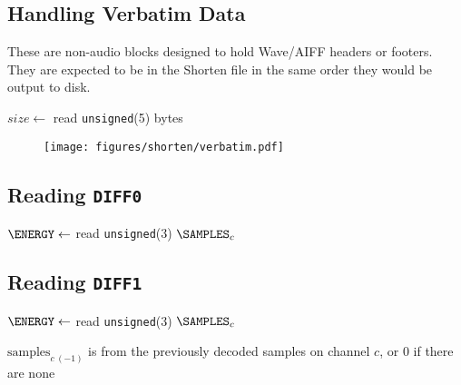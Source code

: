 \clearpage

\subsection{Handling Verbatim Data}

These are non-audio blocks designed to hold Wave/AIFF headers or footers.
They are expected to be in the Shorten file in the same order
they would be output to disk.
\par
\noindent
{}
$size \leftarrow$ read \texttt{unsigned}(5)\;
\Return bytes\;
\EALGORITHM
\begin{figure}[h]
\texttt{[image: figures/shorten/verbatim.pdf]}
\end{figure}

\clearpage

\subsection{Reading \texttt{DIFF0}}
{
$\ENERGY \leftarrow$ read \texttt{unsigned}(3)\;
\BlankLine
{}
\Return $\text{\SAMPLES}_c$\;
\EALGORITHM
}

\subsection{Reading \texttt{DIFF1}}
{
$\ENERGY \leftarrow$ read \texttt{unsigned}(3)\;
\BlankLine
{}
\Return $\text{\SAMPLES}_c$\;
\EALGORITHM
\par
\noindent
$\text{samples}_{c~(-1)}$ is from the previously
decoded samples on channel $c$,
or 0 if there are none
}

